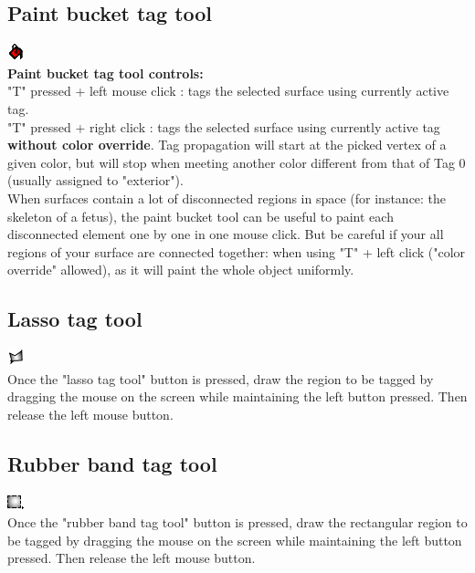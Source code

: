 \subsection{Paint bucket tag tool}
\includegraphics[scale=0.7]{images/12/paint_bucket.png}\\
\textbf{Paint bucket tag tool controls:}\\
"T" pressed + left mouse click : tags the selected surface using currently active tag.\\
"T" pressed + right click : tags the selected surface using currently active tag \textbf{without color override}. Tag propagation will start at the picked vertex of a given color, but will stop when meeting another color different from that of Tag 0 (usually assigned to "exterior").\\
 
When surfaces contain a lot of disconnected regions in space (for instance: the skeleton of a fetus), the paint bucket tool can be useful to paint each disconnected element one by one in one mouse click. But be careful if your all regions of your surface are connected together: when using "T" + left click ("color override" allowed), as it will paint the whole object uniformly.

\subsection{Lasso tag tool} \label{lasso_tag_section}
\includegraphics[scale=0.7]{images/12/lasso.png}\\
Once the "lasso tag tool" button is pressed, draw the region to be tagged by dragging the mouse on the screen while maintaining the left button pressed. Then release the left mouse button. 

\subsection{Rubber band tag tool} \label{rubber_band_tag_section}
\includegraphics[scale=0.7]{images/12/rubber_band.png}\\
Once the "rubber band tag tool" button is pressed, draw the rectangular region to be tagged by dragging the mouse on the screen while maintaining the left button pressed. Then release the left mouse button. 


